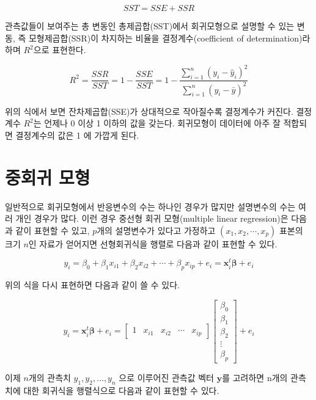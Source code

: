 \documentclass[
]{book}
\theoremstyle{definition}
\theoremstyle{definition}
\theoremstyle{definition}
\theoremstyle{remark}
\begin{document}
\[ SST = SSE + SSR \]

관측값들이 보여주는 총 변동인 총제곱합(SST)에서 회귀모형으로 설명할 수 있는 변동, 즉 모형제곱합(SSR)이 차지하는 비율을 결정계수(coefficient of determination)라 하며 \(R^2\)으로 표현한다.

\[ R^2 = \frac{SSR}{SST} =  1 -\frac{SSE}{SST}  =1- \frac{\sum^n_{i=1}(y_i-\hat y_i)^2}{ \sum^n_{i=1}(y_i - \bar y)^2} \]

위의 식에서 보면 잔차제곱합(SSE)가 상대적으로 작아질수록 결정계수가 커진다.
결정계수 \(R^2\)는 언제나 0 이상 1 이하의 값을 갖는다. 회귀모형이 데이터에 아주 잘 적합되면 결정계수의 값은 1 에 가깝게 된다.

\hypertarget{uxc911uxd68cuxadc0-uxbaa8uxd615}{%
\section{중회귀 모형}\label{uxc911uxd68cuxadc0-uxbaa8uxd615}}

일반적으로 회귀모형에서 반응변수의 수는 하나인 경우가 많지만 설명변수의 수는 여러 개인 경우가 많다. 이런 경우 중선형 회귀 모형(multiple linear regression)은 다음과 같이 표현할 수 있고, \(p\)개의 설명변수가 있다고 가정하고 \((x_1, x_2, \cdots, x_p)\) 표본의 크기 \(n\)인 자료가 얻어지면 선형회귀식을 행렬로 다음과 같이 표현할 수 있다.

\begin{equation*}
y_i = \beta_0 + \beta_1 x_{i1} + \beta_2 x_{i2} + \cdots + \beta_p x_{ip} +  e_i = \bm x^t_i \bm \beta +  e_i 
\end{equation*}

위의 식을 다시 표현하면 다음과 같이 쓸 수 있다.

\[ 
y_i  = \bm x^t_i \bm \beta  + e_i  =
\begin{bmatrix}
1 & x_{i1} & x_{i2} & \cdots & x_{ip}
\end{bmatrix}
\begin{bmatrix}
\beta_{0} \\
\beta_{1} \\
\beta_{2} \\
\vdots \\
\beta_{p}
\end{bmatrix}
+ e_i
\]

이제 \(n\)개의 관측치 \(y_1,y_2, \dots, y_n\) 으로 이루어진 관측값 벡터 \(\bm y\)를 고려하면 n개의 관측치에 대한 회귀식을 행렬식으로 다음과 같이 표현할 수 있다.
\end{document}
